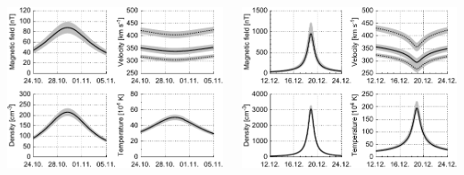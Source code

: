 \documentclass[11pt,aspectratio=1610]{beamer}	%
\newcommand{\captionoftiny}[2]{\captionof{#1}{\color{gray} \tiny #2}}
\begin{document}
\begin{frame}[c]{}{}
	\begin{columns}[c]
		
		\includegraphics[width=\textwidth]{../figures_paper/SPP_perihelia_prediction_f_plot.pdf}


		\includegraphics[width=\textwidth]{../figures_paper/SPP_perihelia_prediction_nearest_f_plot.pdf}

	\end{columns}
\end{frame}
\end{document}
